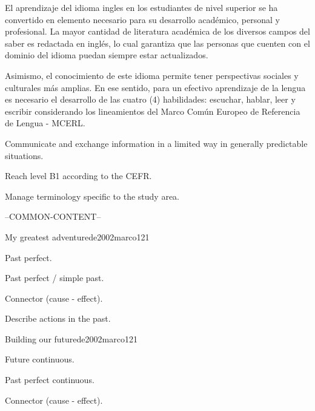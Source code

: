 \begin{syllabus}

\begin{justification}
El aprendizaje del idioma ingles en los estudiantes de nivel superior se ha 
convertido en elemento necesario para su desarrollo académico, personal y 
profesional. La mayor cantidad de literatura académica de los diversos 
campos del saber es redactada en inglés, lo cual garantiza que las personas 
que cuenten con el dominio del idioma puedan siempre estar actualizados. 

Asimismo, el conocimiento de este idioma permite tener perspectivas sociales y 
culturales más amplias. En ese sentido, para un efectivo aprendizaje de la 
lengua es necesario el desarrollo de las cuatro (4) habilidades: 
escuchar, hablar, leer y escribir considerando los lineamientos del 
Marco Común Europeo de Referencia de Lengua - MCERL.
\end{justification}

\begin{goals}
\item Communicate and exchange information in a limited way in generally predictable situations.
\item Reach level B1 according to the CEFR.
\item Manage terminology specific to the study area.
\end{goals}

--COMMON-CONTENT--

\begin{unit}{My greatest adventure}{}{de2002marco}{12}{1}
   \begin{topics}
      \item Past perfect.
      \item Past perfect / simple past.
      \item Connector (cause - effect).
   \end{topics}

   \begin{learningoutcomes}
      \item Describe actions in the past.
   \end{learningoutcomes}

\end{unit}

\begin{unit}{Building our future}{}{de2002marco}{12}{1}
   \begin{topics}
      \item Future continuous.
      \item Past perfect continuous.
      \item Connector (cause - effect).
   \end{topics}


\end{unit}
\end{syllabus}
